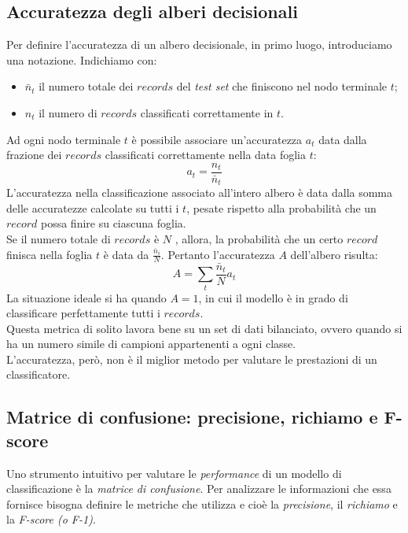 \subsection{Accuratezza degli alberi decisionali}
Per definire l'accuratezza di un albero decisionale, in primo luogo, introduciamo una notazione. Indichiamo con:
\begin{itemize}
    \item $\bar{n}_{t}$ il numero totale dei $records$ del \textit{test set} che finiscono nel nodo terminale $t$;
    \item $n_{t}$ il numero di $records$ classificati correttamente in $t$.
\end{itemize}
Ad ogni nodo terminale $t$ è possibile associare un'accuratezza $a_{t}$ data dalla frazione dei $records$ classificati correttamente nella data foglia $t$:
\begin{equation}
a_{t}=\frac{n_{t}}{\bar{n}_{t}}
\label{eq:acc_t}
\end{equation}
L’accuratezza nella classificazione associato all’intero albero è data dalla somma delle accuratezze calcolate su tutti i $t$, pesate rispetto alla probabilità che un $record$ possa finire su ciascuna foglia.\\
Se il numero totale di $records$ è $N$ , allora, la probabilità che un certo $record$ finisca nella foglia $t$ è data da $\frac{\bar{n}_{i}}{N}$. Pertanto l'accuratezza $A$ dell'albero risulta:
\begin{equation}
A=\sum_{t} \frac{\bar{n}_{t}}{N} a_{t}
\label{eq:acc}
\end{equation}
La situazione ideale si ha quando $A=1$, in cui il modello è in grado di classificare perfettamente tutti i $records$.\\ 
Questa metrica di solito lavora bene su un set di dati bilanciato, ovvero quando si ha un numero simile di campioni appartenenti a ogni classe.\\
L'accuratezza, però, non è il miglior metodo per valutare le prestazioni di un classificatore.

\subsection{Matrice di confusione: precisione, richiamo e F-score}
\label{subsec:confmatr}
Uno strumento intuitivo per valutare le \textit{performance} di un modello di classificazione è la \textit{matrice di confusione}. Per analizzare le informazioni che essa fornisce bisogna definire le metriche che utilizza e cioè la \textit{precisione}, il \textit{richiamo} e la \textit{F-score (o F-1)}.

